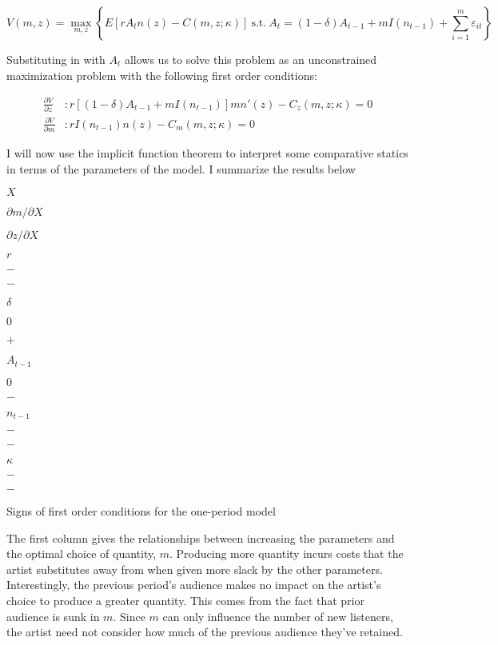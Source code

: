 \documentclass[
]{article}
\begin{document}
\begin{equation} \label{eq:one_period_general}
V(m,z)=\max_{m,z}\left\{E\left[rA_tn(z)-C(m,z;\kappa)\right]  \ \textrm{s.t.} \ A_t=(1-\delta)A_{t-1}+mI(n_{t-1})+\sum_{i=1}^m\varepsilon_{it}\right\}
\end{equation}

Substituting in with \(A_t\) allows us to solve this problem as an
unconstrained maximization problem with the following first order
conditions:

\begin{equation} \label{eq:general_focs}
\begin{split}
\frac{\partial V}{\partial z}&\colon r\left[(1-\delta)A_{t-1}+mI(n_{t-1})\right]mn'(z)-C_z(m,z;\kappa)=0 \\
\frac{\partial V}{\partial m}&\colon r I(n_{t-1})n(z)-C_m(m,z;\kappa)=0
\end{split}
\end{equation}

I will now use the implicit function theorem to interpret some
comparative statics in terms of the parameters of the model. I summarize
the results below

\(X\)

\(\partial m/\partial X\)

\(\partial z/\partial X\)

\(r\)

\(-\)

\(-\)

\(\delta\)

\(0\)

\(+\)

\(A_{t-1}\)

\(0\)

\(-\)

\(n_{t-1}\)

\(-\)

\(-\)

\(\kappa\)

\(-\)

\(-\)

Signs of first order conditions for the one-period model

The first column gives the relationships between increasing the
parameters and the optimal choice of quantity, \(m\). Producing more
quantity incurs costs that the artist substitutes away from when given
more slack by the other parameters. Interestingly, the previous period's
audience makes no impact on the artist's choice to produce a greater
quantity. This comes from the fact that prior audience is sunk in \(m\).
Since \(m\) can only influence the number of new listeners, the artist
need not consider how much of the previous audience they've retained.
\end{document}
